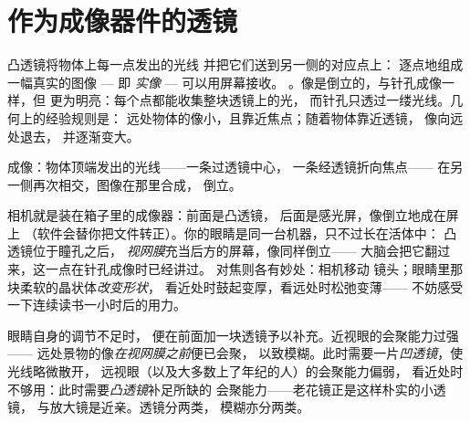 \section{作为成像器件的透镜}

\begin{proposition}[实像]\label{prop:g8:lenses-images:realimage}
凸透镜将物体上每一点发出的光线
并把它们送到另一侧的对应点上：
逐点地组成一幅真实的图像 --- 即
\emph{实像} --- 可以用屏幕接收。
。像是倒立的，与针孔成像一样，但
更为明亮：每个点都能收集整块透镜上的光，
而针孔只透过一缕光线。几何上的经验规则是：
远处物体的像小，且靠近焦点；随着物体靠近透镜，
像向远处退去，
并逐渐变大。
\end{proposition}

\begin{omfigure}

{\small 成像：物体顶端发出的光线——一条过透镜中心，
一条经透镜折向焦点——
在另一侧再次相交，图像在那里合成，
倒立。}
\end{omfigure}

\begin{example}\label{ex:g8:lenses-images:cameraeye}
相机就是装在箱子里的成像器：前面是凸透镜，
后面是感光屏，像倒立地成在屏上
（软件会替你把文件转正）。你的眼睛是同一台机器，只不过长在活体中：
凸透镜位于瞳孔之后，
\emph{视网膜}充当后方的屏幕，像同样倒立——
大脑会把它翻过来，这一点在针孔成像时已经讲过。
对焦则各有妙处：相机移动
镜头；眼睛里那块柔软的晶状体\emph{改变形状}，
看近处时鼓起变厚，看远处时松弛变薄——
不妨感受一下连续读书一小时后的用力。
\end{example}

\begin{example}[眼镜]\label{ex:g8:lenses-images:spectacles}
眼睛自身的调节不足时，
便在前面加一块透镜予以补充。近视眼的会聚能力过强——
远处景物的像\emph{在视网膜之前}便已会聚，
以致模糊。此时需要一片\emph{凹透镜}，使光线略微散开，
远视眼（以及大多数上了年纪的人）的会聚能力偏弱，
看近处时不够用：此时需要\emph{凸透镜}补足所缺的
会聚能力——老花镜正是这样朴实的小透镜，
与放大镜是近亲。透镜分两类，
模糊亦分两类。
\end{example}

